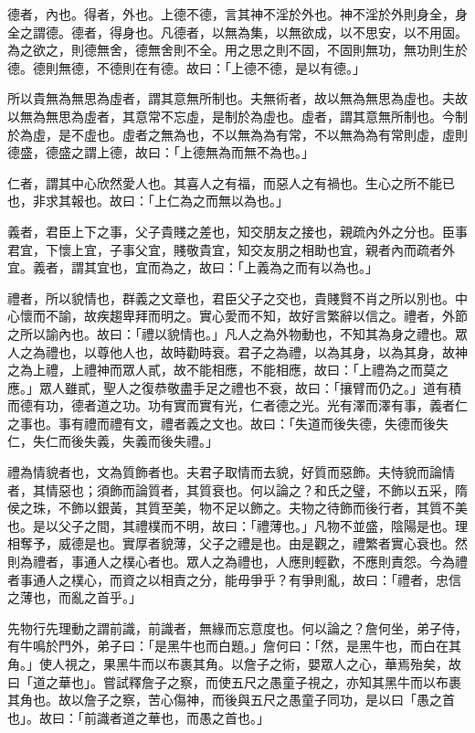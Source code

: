 
\begin{pinyinscope}
德者，內也。得者，外也。上德不德，言其神不淫於外也。神不淫於外則身全，身全之謂德。德者，得身也。凡德者，以無為集，以無欲成，以不思安，以不用固。為之欲之，則德無舍，德無舍則不全。用之思之則不固，不固則無功，無功則生於德。德則無德，不德則在有德。故曰：「上德不德，是以有德。」

所以貴無為無思為虛者，謂其意無所制也。夫無術者，故以無為無思為虛也。夫故以無為無思為虛者，其意常不忘虛，是制於為虛也。虛者，謂其意無所制也。今制於為虛，是不虛也。虛者之無為也，不以無為為有常，不以無為為有常則虛，虛則德盛，德盛之謂上德，故曰：「上德無為而無不為也。」

仁者，謂其中心欣然愛人也。其喜人之有福，而惡人之有禍也。生心之所不能已也，非求其報也。故曰：「上仁為之而無以為也。」

義者，君臣上下之事，父子貴賤之差也，知交朋友之接也，親疏內外之分也。臣事君宜，下懷上宜，子事父宜，賤敬貴宜，知交友朋之相助也宜，親者內而疏者外宜。義者，謂其宜也，宜而為之，故曰：「上義為之而有以為也。」

禮者，所以貌情也，群義之文章也，君臣父子之交也，貴賤賢不肖之所以別也。中心懷而不諭，故疾趨卑拜而明之。實心愛而不知，故好言繁辭以信之。禮者，外節之所以諭內也。故曰：「禮以貌情也。」凡人之為外物動也，不知其為身之禮也。眾人之為禮也，以尊他人也，故時勸時衰。君子之為禮，以為其身，以為其身，故神之為上禮，上禮神而眾人貳，故不能相應，不能相應，故曰：「上禮為之而莫之應。」眾人雖貳，聖人之復恭敬盡手足之禮也不衰，故曰：「攘臂而仍之。」道有積而德有功，德者道之功。功有實而實有光，仁者德之光。光有澤而澤有事，義者仁之事也。事有禮而禮有文，禮者義之文也。故曰：「失道而後失德，失德而後失仁，失仁而後失義，失義而後失禮。」

禮為情貌者也，文為質飾者也。夫君子取情而去貌，好質而惡飾。夫恃貌而論情者，其情惡也；須飾而論質者，其質衰也。何以論之？和氏之璧，不飾以五采，隋侯之珠，不飾以銀黃，其質至美，物不足以飾之。夫物之待飾而後行者，其質不美也。是以父子之間，其禮樸而不明，故曰：「禮薄也。」凡物不並盛，陰陽是也。理相奪予，威德是也。實厚者貌薄，父子之禮是也。由是觀之，禮繁者實心衰也。然則為禮者，事通人之樸心者也。眾人之為禮也，人應則輕歡，不應則責怨。今為禮者事通人之樸心，而資之以相責之分，能毋爭乎？有爭則亂，故曰：「禮者，忠信之薄也，而亂之首乎。」

先物行先理動之謂前識，前識者，無緣而忘意度也。何以論之？詹何坐，弟子侍，有牛鳴於門外，弟子曰：「是黑牛也而白題。」詹何曰：「然，是黑牛也，而白在其角。」使人視之，果黑牛而以布裹其角。以詹子之術，嬰眾人之心，華焉殆矣，故曰「道之華也」。嘗試釋詹子之察，而使五尺之愚童子視之，亦知其黑牛而以布裹其角也。故以詹子之察，苦心傷神，而後與五尺之愚童子同功，是以曰「愚之首也」。故曰：「前識者道之華也，而愚之首也。」


\end{pinyinscope}
